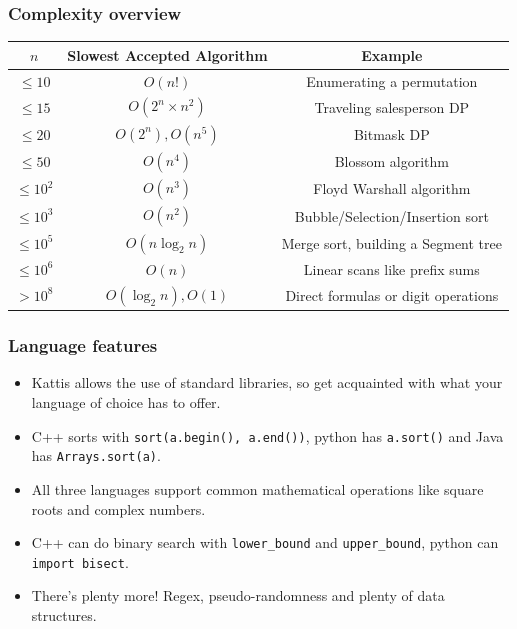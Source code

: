 \documentclass{beamer}
\begin{document}
\begin{frame}[plain]
    \frametitle{Complexity overview}
    \scriptsize
    \begin{center}
        \begin{tabular}{c|c|c}
            $n$ & Slowest Accepted Algorithm & Example \\
            \hline
            $\leq 10$ & $O(n!)$ & Enumerating a permutation \\
            $\leq 15$ & $O(2^n\times n^2)$ & Traveling salesperson DP \\
            $\leq 20$ & $O(2^n), O(n^5)$ & Bitmask DP \\
            $\leq 50$ & $O(n^4)$ & Blossom algorithm \\
            $\leq 10^2$ & $O(n^3)$ & Floyd Warshall algorithm \\
            $\leq 10^3$ & $O(n^2)$ & Bubble/Selection/Insertion sort \\
            $\leq 10^5$ & $O(n\log_2{n})$ & Merge sort, building a Segment tree \\
            $\leq 10^6$ & $O(n)$ & Linear scans like prefix sums \\
            $> 10^8$ & $O(\log_2{n}), O(1)$ & Direct formulas or digit operations \\
        \end{tabular}
    \end{center}
\end{frame}

\begin{frame}[plain]
    \frametitle{Language features}
    \scriptsize
    \begin{itemize}
        \item Kattis allows the use of standard libraries, so get acquainted with what your language of choice has to offer.
        \item C++ sorts with \texttt{sort(a.begin(), a.end())}, python has \texttt{a.sort()} and Java has \texttt{Arrays.sort(a)}.
        \item All three languages support common mathematical operations like square roots and complex numbers.
        \item C++ can do binary search with \texttt{lower\_bound} and \texttt{upper\_bound}, python can \texttt{import bisect}.
        \item There's plenty more! Regex, pseudo-randomness and plenty of data structures.
    \end{itemize}
\end{frame}
\end{document}
